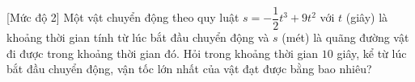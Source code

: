 \begin{bt}%
[Mức độ 2]%
	Một vật chuyển động theo quy luật $s=-\dfrac{1}{2}t^3+9t^2$ với $t$ (giây) là khoảng thời gian tính từ lúc bắt đầu chuyển động và $s$ (mét) là quãng đường vật đi được trong khoảng thời gian đó. Hỏi trong khoảng thời gian $10$ giây, kể từ lúc bắt đầu chuyển động, vận tốc lớn nhất của vật đạt được bằng bao nhiêu?
\end{bt}

